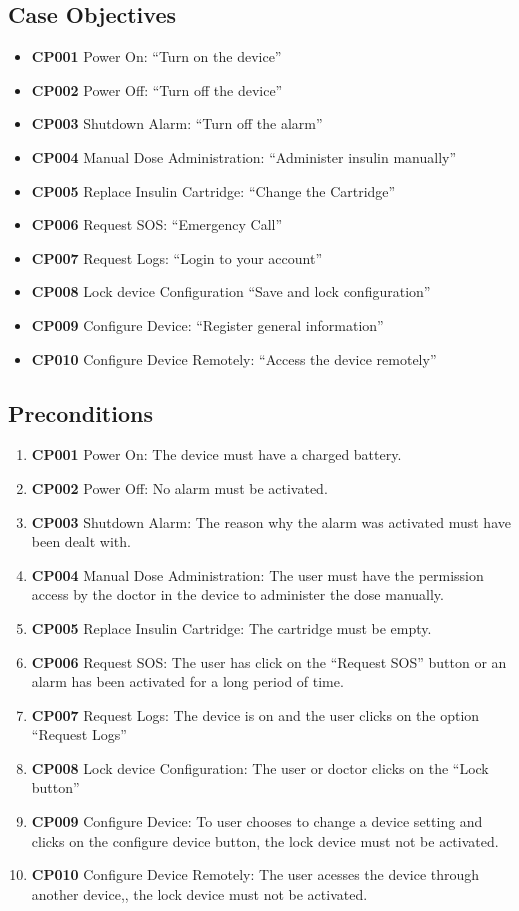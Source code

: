 \documentclass{scrreprt}
\begin{document}
\subsection{Case Objectives}
\begin{itemize}
    \item \textbf{CP001} Power On:  “Turn on the device”
    \item \textbf{CP002} Power Off: “Turn off the device”
    \item \textbf{CP003} Shutdown Alarm: “Turn off the alarm”
    \item \textbf{CP004} Manual Dose Administration: “Administer insulin manually”
    \item \textbf{CP005} Replace Insulin Cartridge: “Change the Cartridge”
    \item \textbf{CP006} Request SOS: “Emergency Call”
    \item \textbf{CP007} Request Logs: “Login to your account”
    \item \textbf{CP008} Lock device Configuration “Save and lock configuration”
    \item \textbf{CP009} Configure Device: “Register general information”
    \item \textbf{CP010} Configure Device Remotely:  “Access the device remotely”
\end{itemize}

\subsection{Preconditions}
\begin{enumerate}
    \item \textbf{CP001} Power On: The device must have a charged battery.
    \item \textbf{CP002} Power Off: No alarm must be activated.
    \item \textbf{CP003} Shutdown Alarm: The reason why the alarm was activated must have been dealt with.
    \item \textbf{CP004} Manual Dose Administration: The user must have the permission access by the doctor in the device to administer the dose manually.
    \item \textbf{CP005} Replace Insulin Cartridge: The cartridge must be empty.
    \item \textbf{CP006} Request SOS: The user has click on the “Request SOS” button or an alarm has been activated for a long period of time.
    \item \textbf{CP007} Request Logs: The device is on and the user clicks on the option “Request Logs”
    \item \textbf{CP008} Lock device Configuration: The user or doctor clicks on the “Lock button” 
    \item \textbf{CP009} Configure Device: To user chooses to change a device setting and clicks on the configure device button, the lock device must not be activated.
    \item \textbf{CP010} Configure Device Remotely: The user acesses the device through another device,, the lock device must not be activated.
\end{enumerate}
\end{document}
